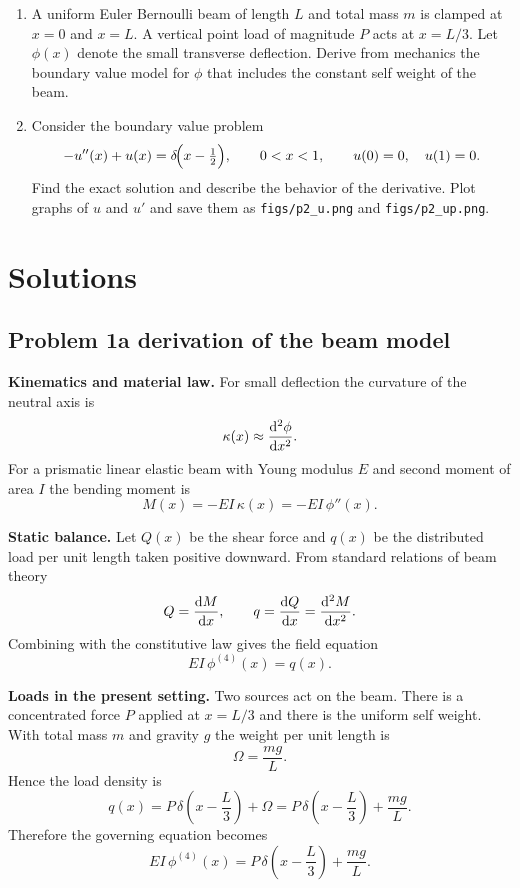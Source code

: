 \documentclass[12pt, a4paper]{article}
\begin{document}
\begin{enumerate}[leftmargin=1.2em,label=\arabic*.]

  \item A uniform Euler Bernoulli beam of length $L$ and total mass $m$ is clamped at $x=0$ and $x=L$.
  A vertical point load of magnitude $P$ acts at $x=L/3$.
  Let $\phi(x)$ denote the small transverse deflection.
  Derive from mechanics the boundary value model for $\phi$ that includes the constant self weight of the beam.

  \item Consider the boundary value problem
  \[
    -u''(x)+u(x)=\delta\!\Bigl(x-\tfrac12\Bigr),\qquad 0<x<1,
    \qquad u(0)=0,\quad u(1)=0 .
  \]
  Find the exact solution and describe the behavior of the derivative.
  Plot graphs of \(u\) and \(u'\) and save them as
  \texttt{figs/p2\_u.png} and \texttt{figs/p2\_up.png}.
\end{enumerate}

\newpage
\section*{Solutions}

\subsection*{Problem 1a  derivation of the beam model}

\textbf{Kinematics and material law.}
For small deflection the curvature of the neutral axis is
\[
\kappa(x)\approx \dv[2]{\phi}{x}.
\]
For a prismatic linear elastic beam with Young modulus $E$ and second moment of area $I$ the bending moment is
\[
M(x)=-E I\,\kappa(x)=-E I\,\phi''(x).
\]

\textbf{Static balance.}
Let $Q(x)$ be the shear force and $q(x)$ be the distributed load per unit length taken positive downward.
From standard relations of beam theory
\[
Q=\dv{M}{x},\qquad q=\dv{Q}{x}=\dv[2]{M}{x}.
\]
Combining with the constitutive law gives the field equation
\[
E I\,\phi^{(4)}(x)=q(x).
\]

\textbf{Loads in the present setting.}
Two sources act on the beam.
There is a concentrated force $P$ applied at $x=L/3$ and there is the uniform self weight.
With total mass $m$ and gravity $g$ the weight per unit length is
\[
\Omega=\frac{m g}{L}.
\]
Hence the load density is
\[
q(x)=P\,\delta\!\left(x-\frac{L}{3}\right)+\Omega
    =P\,\delta\!\left(x-\frac{L}{3}\right)+\frac{m g}{L}.
\]
Therefore the governing equation becomes
\[
E I\,\phi^{(4)}(x)=P\,\delta\!\left(x-\frac{L}{3}\right)+\frac{m g}{L}.
\]
\end{document}
